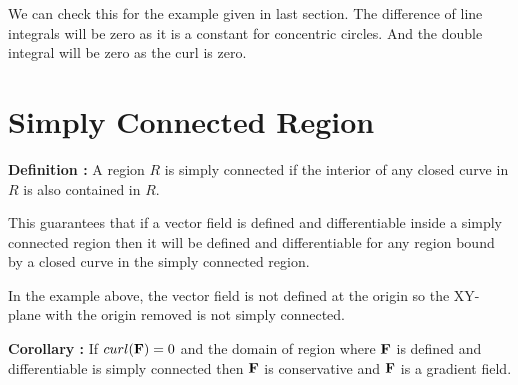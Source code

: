 We can check this for the example given in last section.
The difference of line integrals will be zero as it is a constant for concentric circles.
And the double integral will be zero as the curl is zero.

\section{Simply Connected Region}

{\bf Definition : } A region $R$ is simply connected if the interior of any closed curve in $R$ is also contained in $R$.

This guarantees that if a vector field is defined and differentiable inside a simply connected region then it will be defined and differentiable for any region bound by a closed curve 
in the simply connected region.

In the example above, the vector field is not defined at the origin so the XY-plane with the origin removed is not simply connected.


{\bf Corollary : } If $curl({\bf F}) = 0$ and the domain of region where ${\bf F}$ is defined and differentiable is simply connected then ${\bf F}$ is conservative and ${\bf F}$ is a gradient field.